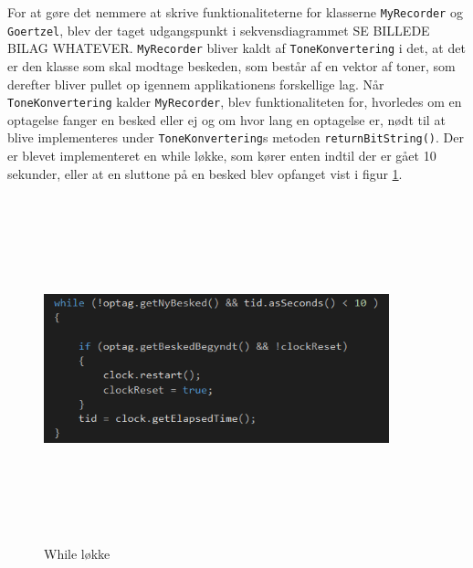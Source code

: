 For at gøre det nemmere at skrive funktionaliteterne for klasserne \texttt{MyRecorder} og \texttt{Goertzel}, blev der taget udgangspunkt i sekvensdiagrammet SE BILLEDE BILAG WHATEVER. 
\newline
\texttt{MyRecorder} bliver kaldt af \texttt{ToneKonvertering} i det, at det er den klasse som skal modtage beskeden, som består af en vektor af toner, som derefter bliver pullet op igennem applikationens forskellige lag.
\newline
Når \texttt{ToneKonvertering} kalder \texttt{MyRecorder}, blev funktionaliteten for, hvorledes om en optagelse fanger en besked eller ej og om hvor lang en optagelse er, nødt til at blive implementeres under \texttt{ToneKonvertering}s metoden \texttt{returnBitString()}.
\newline
Der er blevet implementeret en while løkke, som kører enten indtil der er gået 10 sekunder, eller at en sluttone på en besked blev opfanget vist i  figur \ref{fig:returnbitstrengwhile}.
\begin{figure}[ht]
	\centering
	\includegraphics[width=10cm,height=10cm,keepaspectratio]{pictures/Returnbitstrengwhileloekke.PNG}
	\caption{While løkke}
	\label{fig:returnbitstrengwhile}
\end{figure}
\hfill \break

